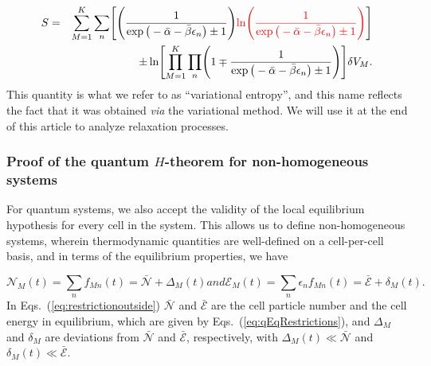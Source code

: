 %
\begin{eqnarray}\label{eq:varEntropyDef}
      S&=&\sum_{M=1}^{K}
        \sum_n  \left[
        		\left(\frac{1}{\exp\big(-\bar{\alpha}-\bar{\beta}\epsilon_{n}\big)\pm 1} \right)
           \commr{\ln \left(\frac{1}{\exp\big(-\bar{\alpha}-\bar{\beta}\epsilon_{n}\big)\pm 1} \right)}
         \right]\nonumber \\
      &&\quad\pm  \ln \left[\prod_{M=1}^{K} \prod_{n}
         \left(1 \mp \frac{1}{\exp\big(-\bar{\alpha}-\bar{\beta}\epsilon_{n}\big)\pm 1} \right)
         \right] \delta V_M.
\end{eqnarray}
%
This quantity is what we refer to as ``variational entropy'',
and this name reflects the fact that it was obtained \textit{via}
the variational method. We will use it at the end of this article to analyze relaxation processes.

\subsubsection{Proof of the quantum $H$-theorem for non-homogeneous systems}

For quantum systems, we also accept the validity of the local equilibrium hypothesis
for every cell in the system. This allows us to define non-homogeneous systems,
wherein thermodynamic quantities are well-defined on a cell-per-cell basis,
and in terms of the equilibrium properties, we have

%
\begin{subequations}\label{eq:restrictionoutside}
\begin{equation}
        \mathcal{N}_M(t)=\sum_{n}f_{Mn}(t)=\bar{\mathcal{N}}+\Delta_M(t) 
\end{equation}
  and
\begin{equation}
        \mathcal{E}_M(t)=\sum_{n}\epsilon_{n}f_{Mn}(t)=\bar{\mathcal{E}}+ \delta_M(t).
\end{equation}
\end{subequations}
%
In Eqs.~(\ref{eq:restrictionoutside}) $\bar {\mathcal{N}}$ and $\bar{\mathcal{E}}$ are the cell particle
number and the cell energy in equilibrium, which are given by Eqs.~(\ref{eq:qEqRestrictions}),
and $\Delta_M$ and $\delta_M$ are deviations from $\bar{\mathcal{N}}$
and $\bar{\mathcal{E}}$, respectively, with $\Delta_M(t)\ll \bar{\mathcal{N}}$
and $\delta_M(t) \ll \bar{\mathcal{E}}$. 


